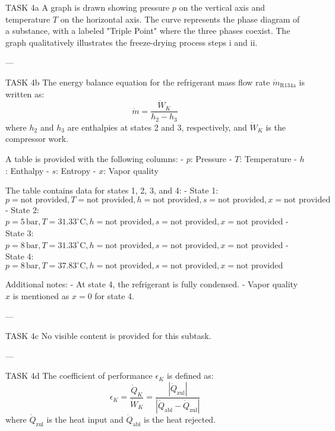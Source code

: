 TASK 4a  
A graph is drawn showing pressure \( p \) on the vertical axis and temperature \( T \) on the horizontal axis. The curve represents the phase diagram of a substance, with a labeled "Triple Point" where the three phases coexist. The graph qualitatively illustrates the freeze-drying process steps i and ii.

---

TASK 4b  
The energy balance equation for the refrigerant mass flow rate \( \dot{m}_{\text{R134a}} \) is written as:  
\[
\dot{m} = \frac{\dot{W}_K}{h_2 - h_3}
\]  
where \( h_2 \) and \( h_3 \) are enthalpies at states 2 and 3, respectively, and \( \dot{W}_K \) is the compressor work.

A table is provided with the following columns:  
- \( p \): Pressure  
- \( T \): Temperature  
- \( h \): Enthalpy  
- \( s \): Entropy  
- \( x \): Vapor quality  

The table contains data for states 1, 2, 3, and 4:  
- State 1: \( p = \text{not provided}, T = \text{not provided}, h = \text{not provided}, s = \text{not provided}, x = \text{not provided} \)  
- State 2: \( p = 5 \, \text{bar}, T = 31.33^\circ\text{C}, h = \text{not provided}, s = \text{not provided}, x = \text{not provided} \)  
- State 3: \( p = 8 \, \text{bar}, T = 31.33^\circ\text{C}, h = \text{not provided}, s = \text{not provided}, x = \text{not provided} \)  
- State 4: \( p = 8 \, \text{bar}, T = 37.83^\circ\text{C}, h = \text{not provided}, s = \text{not provided}, x = \text{not provided} \)  

Additional notes:  
- At state 4, the refrigerant is fully condensed.  
- Vapor quality \( x \) is mentioned as \( x = 0 \) for state 4.

---

TASK 4c  
No visible content is provided for this subtask.

---

TASK 4d  
The coefficient of performance \( \epsilon_K \) is defined as:  
\[
\epsilon_K = \frac{\dot{Q}_K}{\dot{W}_K} = \frac{|\dot{Q}_{\text{zul}}|}{|\dot{Q}_{\text{abl}} - \dot{Q}_{\text{zul}}|}
\]  
where \( \dot{Q}_{\text{zul}} \) is the heat input and \( \dot{Q}_{\text{abl}} \) is the heat rejected.